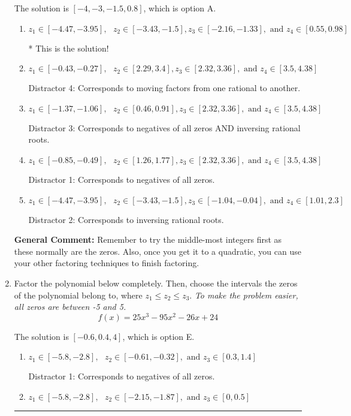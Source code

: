 \documentclass{extbook}[14pt]
\newcommand{\litem}[1]{\item #1

\rule{\textwidth}{0.4pt}}
\begin{document}
\begin{enumerate}
{The solution is \( [-4, -3, -1.5, 0.8] \), which is option A.\begin{enumerate}[label=\Alph*.]
\item \( z_1 \in [-4.47, -3.95], \text{   }  z_2 \in [-3.43, -1.5], z_3 \in [-2.16, -1.33], \text{   and   } z_4 \in [0.55, 0.98] \)

* This is the solution!
\item \( z_1 \in [-0.43, -0.27], \text{   }  z_2 \in [2.29, 3.4], z_3 \in [2.32, 3.36], \text{   and   } z_4 \in [3.5, 4.38] \)

 Distractor 4: Corresponds to moving factors from one rational to another.
\item \( z_1 \in [-1.37, -1.06], \text{   }  z_2 \in [0.46, 0.91], z_3 \in [2.32, 3.36], \text{   and   } z_4 \in [3.5, 4.38] \)

 Distractor 3: Corresponds to negatives of all zeros AND inversing rational roots.
\item \( z_1 \in [-0.85, -0.49], \text{   }  z_2 \in [1.26, 1.77], z_3 \in [2.32, 3.36], \text{   and   } z_4 \in [3.5, 4.38] \)

 Distractor 1: Corresponds to negatives of all zeros.
\item \( z_1 \in [-4.47, -3.95], \text{   }  z_2 \in [-3.43, -1.5], z_3 \in [-1.04, -0.04], \text{   and   } z_4 \in [1.01, 2.3] \)

 Distractor 2: Corresponds to inversing rational roots.
\end{enumerate}

\textbf{General Comment:} Remember to try the middle-most integers first as these normally are the zeros. Also, once you get it to a quadratic, you can use your other factoring techniques to finish factoring.
}
\litem{
Factor the polynomial below completely. Then, choose the intervals the zeros of the polynomial belong to, where $z_1 \leq z_2 \leq z_3$. \textit{To make the problem easier, all zeros are between -5 and 5.}
\[ f(x) = 25x^{3} -95 x^{2} -26 x + 24 \]

The solution is \( [-0.6, 0.4, 4] \), which is option E.\begin{enumerate}[label=\Alph*.]
\item \( z_1 \in [-5.8, -2.8], \text{   }  z_2 \in [-0.61, -0.32], \text{   and   } z_3 \in [0.3, 1.4] \)

 Distractor 1: Corresponds to negatives of all zeros.
\item \( z_1 \in [-5.8, -2.8], \text{   }  z_2 \in [-2.15, -1.87], \text{   and   } z_3 \in [0, 0.5] \)


\end{enumerate}}
\end{enumerate}
\end{document}
